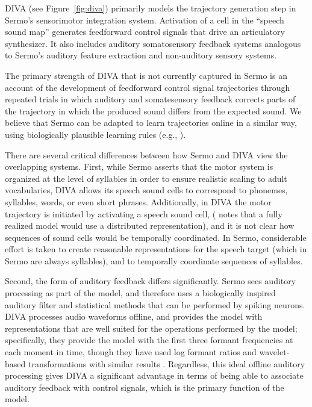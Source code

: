 DIVA (see Figure~\ref{fig:diva}) primarily models
the trajectory generation step
in Sermo's sensorimotor integration system.
Activation of a cell in the ``speech sound map''
generates feedforward control signals
that drive an articulatory synthesizer.
It also includes auditory somatosensory feedback systems
analogous to Sermo's auditory feature extraction
and non-auditory sensory systems.

The primary strength of DIVA
that is not currently captured in Sermo
is an account of the development
of feedforward control signal trajectories
through repeated trials in which
auditory and somatesensory feedback
corrects parts of the trajectory
in which the produced sound differs
from the expected sound.
We believe that Sermo can be adapted
to learn trajectories online in a similar way,
using biologically plausible learning rules
(e.g., \cite{macneil2011,bekolay2013}).

There are several critical differences
between how Sermo and DIVA view
the overlapping systems.
First, while Sermo asserts that
the motor system is organized at the level
of syllables in order to ensure
realistic scaling to adult vocabularies,
DIVA allows its speech sound cells to
correspond to phonemes, syllables, words,
or even short phrases.
Additionally, in DIVA
the motor trajectory is initiated
by activating a speech sound cell,
(\cite{guenther2006a} notes that a fully realized
model would use a distributed representation),
and it is not clear how sequences
of sound cells would be temporally coordinated.
In Sermo, considerable effort is taken
to create reasonable representations
for the speech target
(which in Sermo are always syllables),
and to temporally coordinate
sequences of syllables.

Second, the form of auditory feedback
differs significantly.
Sermo sees auditory processing as part of
the model, and therefore uses
a biologically inspired auditory filter
and statistical methods that can be
performed by spiking neurons.
DIVA processes audio waveforms offline,
and provides the model with
representations that are well suited
for the operations performed by the model;
specifically, they provide the model with
the first three formant frequencies
at each moment in time,
though they have used log formant ratios
and wavelet-based transformations
with similar results \cite{guenther2006a}.
Regardless, this ideal offline auditory processing
gives DIVA a significant advantage
in terms of being able to
associate auditory feedback
with control signals,
which is the primary function of the model.

